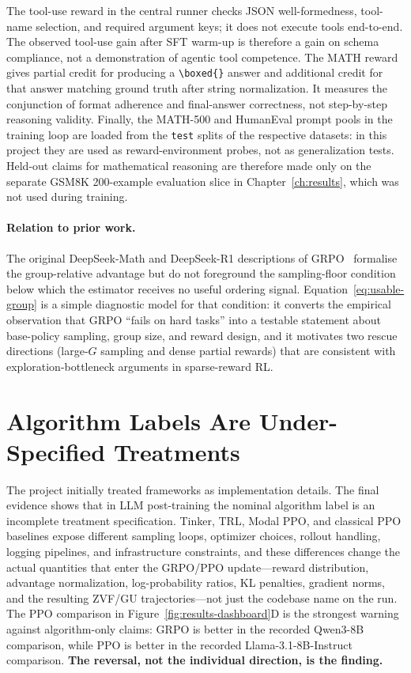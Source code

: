 \documentclass[12pt,a4paper]{report}
\begin{document}
The tool-use reward in the central runner checks JSON well-formedness, tool-name selection, and required argument keys; it does not execute tools end-to-end. The observed tool-use gain after SFT warm-up is therefore a gain on schema compliance, not a demonstration of agentic tool competence. The MATH reward gives partial credit for producing a \verb|\boxed{}| answer and additional credit for that answer matching ground truth after string normalization. It measures the conjunction of format adherence and final-answer correctness, not step-by-step reasoning validity. Finally, the MATH-500 and HumanEval prompt pools in the training loop are loaded from the \texttt{test} splits of the respective datasets: in this project they are used as reward-environment probes, not as generalization tests. Held-out claims for mathematical reasoning are therefore made only on the separate GSM8K 200-example evaluation slice in Chapter~\ref{ch:results}, which was not used during training.

\paragraph{Relation to prior work.}
The original DeepSeek-Math and DeepSeek-R1 descriptions of GRPO~\citep{shao2024deepseekmath,deepseek2025r1} formalise the group-relative advantage but do not foreground the sampling-floor condition below which the estimator receives no useful ordering signal. Equation~\eqref{eq:usable-group} is a simple diagnostic model for that condition: it converts the empirical observation that GRPO ``fails on hard tasks'' into a testable statement about base-policy sampling, group size, and reward design, and it motivates two rescue directions (large-$G$ sampling and dense partial rewards) that are consistent with exploration-bottleneck arguments in sparse-reward RL.

\section{Algorithm Labels Are Under-Specified Treatments}
\label{sec:framework-effects}

The project initially treated frameworks as implementation details. The final evidence shows that in LLM post-training the nominal algorithm label is an incomplete treatment specification. Tinker, TRL, Modal PPO, and classical PPO baselines expose different sampling loops, optimizer choices, rollout handling, logging pipelines, and infrastructure constraints, and these differences change the actual quantities that enter the GRPO/PPO update---reward distribution, advantage normalization, log-probability ratios, KL penalties, gradient norms, and the resulting ZVF/GU trajectories---not just the codebase name on the run. The PPO comparison in Figure~\ref{fig:results-dashboard}D is the strongest warning against algorithm-only claims: GRPO is better in the recorded Qwen3-8B comparison, while PPO is better in the recorded Llama-3.1-8B-Instruct comparison. \textbf{The reversal, not the individual direction, is the finding.}
\end{document}
